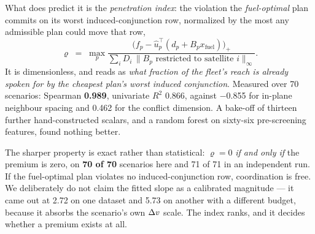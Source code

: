 What does predict it is the \emph{penetration index}: the violation the
\emph{fuel-optimal} plan commits on its worst induced-conjunction row,
normalized by the most any admissible plan could move that row,
\begin{equation}
\varrho \;=\; \max_p
  \frac{\big(f_p - \hat u_p^{\!\top}(d_p + B_p x_{\text{fuel}})\big)_+}
       {\sum_i D_i \,\lVert B_p \text{ restricted to satellite } i\rVert_\infty}.
\end{equation}
It is dimensionless, and reads as \emph{what fraction of the fleet's reach is
already spoken for by the cheapest plan's worst induced conjunction}. Measured
over 70 scenarios: Spearman \textbf{\num{0.989}}, univariate $R^2$ \num{0.866},
against \num{-0.855} for in-plane neighbour spacing and \num{0.462} for the
conflict dimension. A bake-off of thirteen further hand-constructed scalars,
and a random forest on sixty-six pre-screening features, found nothing better.

The sharper property is exact rather than statistical: $\varrho = 0$ \emph{if
and only if} the premium is zero, on \textbf{70 of 70} scenarios here and 71 of
71 in an independent run. If the fuel-optimal plan violates no
induced-conjunction row, coordination is free. We deliberately do not claim the
fitted slope as a calibrated magnitude --- it came out at \num{2.72} on one
dataset and \num{5.73} on another with a different budget, because it absorbs
the scenario's own $\Delta v$ scale. The index ranks, and it decides whether a
premium exists at all.
